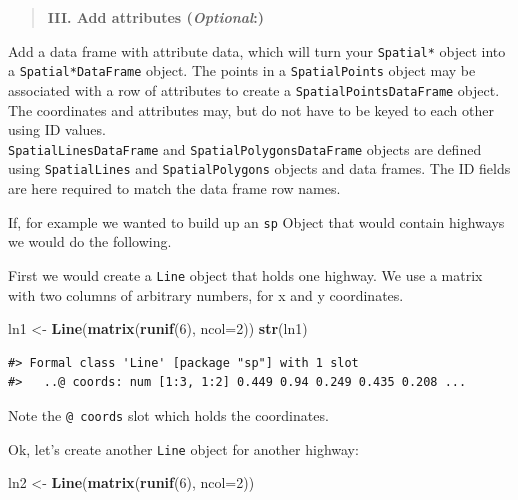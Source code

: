 \documentclass[]{book}
\newenvironment{Shaded}{\begin{snugshade}}{\end{snugshade}}
\newcommand{\KeywordTok}[1]{\textcolor[rgb]{0.13,0.29,0.53}{\textbf{#1}}}
\newcommand{\DataTypeTok}[1]{\textcolor[rgb]{0.13,0.29,0.53}{#1}}
\newcommand{\DecValTok}[1]{\textcolor[rgb]{0.00,0.00,0.81}{#1}}
\newcommand{\StringTok}[1]{\textcolor[rgb]{0.31,0.60,0.02}{#1}}
\newcommand{\NormalTok}[1]{#1}
\begin{document}
\begin{quote}
\textbf{III. Add attributes (\emph{Optional}:)}
\end{quote}

Add a data frame with attribute data, which will turn your
\texttt{Spatial*} object into a \texttt{Spatial*DataFrame} object. The
points in a \texttt{SpatialPoints} object may be associated with a row
of attributes to create a \texttt{SpatialPointsDataFrame} object. The
coordinates and attributes may, but do not have to be keyed to each
other using ID values.\\
\texttt{SpatialLinesDataFrame} and \texttt{SpatialPolygonsDataFrame}
objects are defined using \texttt{SpatialLines} and
\texttt{SpatialPolygons} objects and data frames. The ID fields are here
required to match the data frame row names.

If, for example we wanted to build up an \texttt{sp} Object that would
contain highways we would do the following.

First we would create a \texttt{Line} object that holds one highway. We
use a matrix with two columns of arbitrary numbers, for x and y
coordinates.

\begin{Shaded}
\begin{Highlighting}[]
\NormalTok{ln1 <-}\StringTok{ }\KeywordTok{Line}\NormalTok{(}\KeywordTok{matrix}\NormalTok{(}\KeywordTok{runif}\NormalTok{(}\DecValTok{6}\NormalTok{), }\DataTypeTok{ncol=}\DecValTok{2}\NormalTok{))}
\KeywordTok{str}\NormalTok{(ln1)}
\end{Highlighting}
\end{Shaded}

\begin{verbatim}
#> Formal class 'Line' [package "sp"] with 1 slot
#>   ..@ coords: num [1:3, 1:2] 0.449 0.94 0.249 0.435 0.208 ...
\end{verbatim}

Note the \texttt{@\ coords} slot which holds the coordinates.

Ok, let's create another \texttt{Line} object for another highway:

\begin{Shaded}
\begin{Highlighting}[]
\NormalTok{ln2 <-}\StringTok{ }\KeywordTok{Line}\NormalTok{(}\KeywordTok{matrix}\NormalTok{(}\KeywordTok{runif}\NormalTok{(}\DecValTok{6}\NormalTok{), }\DataTypeTok{ncol=}\DecValTok{2}\NormalTok{))}
\end{Highlighting}
\end{Shaded}
\end{document}
